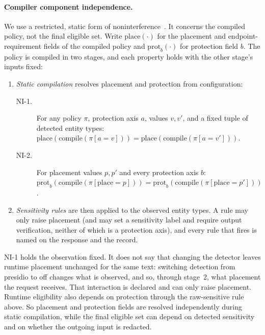 \documentclass[11pt]{article}
\newcommand{\ubreak}{\textunderscore\allowbreak}
\newcommand{\code}[1]{{\ttfamily\let\_\ubreak #1}}
\begin{document}
\paragraph{Compiler component independence.} We use a restricted, static form of
noninterference~\cite{goguen}. It concerns the compiled policy, not the final eligible set.
Write $\mathrm{place}(\cdot)$ for the placement and endpoint-requirement fields of the compiled
policy and $\mathrm{prot}_b(\cdot)$ for protection field $b$. The policy is compiled in two
stages, and each property holds with the other stage's inputs fixed:
\begin{enumerate}
  \item \emph{Static compilation} resolves placement and protection from configuration:
    \begin{description}
      \item[NI-1.] For any policy $\pi$, protection axis $a$, values $v, v'$, and a fixed tuple
        of detected entity types:
        $\mathrm{place}(\mathrm{compile}(\pi[a{=}v])) = \mathrm{place}(\mathrm{compile}(\pi[a{=}v']))$.
      \item[NI-2.] For placement values $p, p'$ and every protection axis $b$:
        $\mathrm{prot}_b(\mathrm{compile}(\pi[\mathrm{place}{=}p])) =
         \mathrm{prot}_b(\mathrm{compile}(\pi[\mathrm{place}{=}p']))$.
    \end{description}
  \item \emph{Sensitivity rules} are then applied to the observed entity types. A rule may only
    raise placement (and may set a sensitivity label and require output verification, neither
    of which is a protection axis), and every rule that fires is named on the response and
    the record.
\end{enumerate}
NI-1 holds the observation fixed. It does not say that changing the detector leaves runtime
placement unchanged for the same text: switching detection from \code{presidio} to \code{off}
changes what is observed, and so, through stage~2, what placement the request receives. That
interaction is declared and can only raise placement. Runtime eligibility also depends on
protection through the raw-sensitive rule above. So placement and protection fields are resolved
independently during static compilation, while the final eligible set can depend on detected
sensitivity and on whether the outgoing input is redacted.
\end{document}
